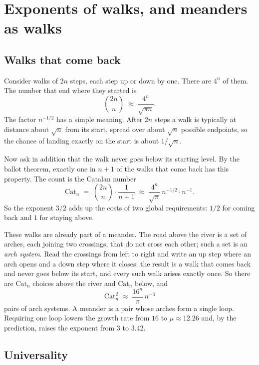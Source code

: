 \section{Exponents of walks, and meanders as walks}\label{sec:walks}

\subsection{Walks that come back}

Consider walks of $2n$ steps, each step up or down by one. There are $4^n$ of them. The number
that end where they started is
\[ \binom{2n}{n} \;\approx\; \frac{4^n}{\sqrt{\pi n}} . \]
The factor $n^{-1/2}$ has a simple meaning. After $2n$ steps a walk is typically at distance
about $\sqrt n$ from its start, spread over about $\sqrt n$ possible endpoints, so the chance of
landing exactly on the start is about $1/\sqrt n$.

Now ask in addition that the walk never goes below its starting level. By the ballot theorem,
exactly one in $n+1$ of the walks that come back has this property. The count is the Catalan
number
\begin{equation}\label{eq:catalan}
\mathrm{Cat}_n \;=\; \binom{2n}{n}\cdot\frac{1}{n+1} \;\approx\; \frac{4^n}{\sqrt\pi}\, n^{-1/2}\cdot n^{-1} .
\end{equation}
So the exponent $3/2$ adds up the costs of two global requirements: $1/2$ for coming back and
$1$ for staying above.

These walks are already part of a meander. The road above the river is a set of arches, each
joining two crossings, that do not cross each other; such a set is an \emph{arch system}.
Read the crossings from left to right and write an up step where an arch opens and a down step
where it closes: the result is a walk that comes back and never goes below its start, and every
such walk arises exactly once. So there are $\mathrm{Cat}_n$ choices above the river and
$\mathrm{Cat}_n$ below, and
\[ \mathrm{Cat}_n^2 \;\approx\; \frac{16^n}{\pi}\, n^{-3} \]
pairs of arch systems. A meander is a pair whose arches form a single loop. Requiring one loop
lowers the growth rate from $16$ to $\mu\approx 12.26$ and, by the prediction, raises the
exponent from $3$ to $3.42$.

\subsection{Universality}

